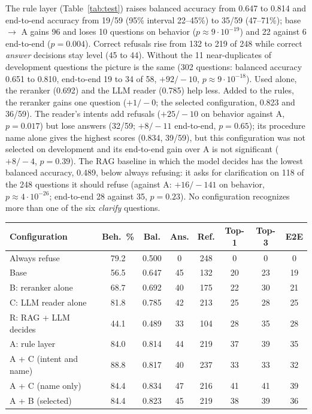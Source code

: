 The rule layer (Table~\ref{tab:test}) raises balanced accuracy from 0.647 to 0.814 and end-to-end accuracy from 19/59 (95\% interval
22--45\%) to 35/59 (47--71\%); base $\rightarrow$ A gains 96 and loses 10 questions on behavior ($p\approx 9\cdot10^{-19}$) and 22 against 6
end-to-end ($p=0.004$). Correct refusals rise from 132 to 219 of 248 while correct \emph{answer} decisions stay level (45 to 44). Without
the 11 near-duplicates of development questions the picture is the same (302 questions: balanced accuracy 0.651 to 0.810, end-to-end 19 to
34 of 58, $+92/-10$, $p\approx 9\cdot10^{-18}$). Used alone, the reranker (0.692) and the LLM reader (0.785) help less. Added to the rules,
the reranker gains one question ($+1/-0$; the selected configuration, 0.823 and 36/59). The reader's intents add refusals ($+25/-10$ on
behavior against A, $p=0.017$) but lose answers (32/59; $+8/-11$ end-to-end, $p=0.65$); its procedure name alone gives the highest scores
(0.834, 39/59), but this configuration was not selected on development and its end-to-end gain over A is not significant ($+8/-4$,
$p=0.39$). The RAG baseline in which the model decides has the lowest balanced accuracy, 0.489, below always refusing: it asks for
clarification on 118 of the 248 questions it should refuse (against A: $+16/-141$ on behavior, $p\approx 4\cdot10^{-26}$; end-to-end 28
against 35, $p=0.23$). No configuration recognizes more than one of the six \emph{clarify} questions.

\begin{table}[h]
{\begin{tabular}{@{}lccccccc@{}}\toprule
Configuration & Beh.\ \% & Bal. & Ans. & Ref. & Top-1 & Top-3 & E2E \\ \midrule
Always refuse & 79.2 & 0.500 & 0 & 248 & 0 & 0 & 0 \\
Base & 56.5 & 0.647 & 45 & 132 & 20 & 23 & 19 \\
B: reranker alone & 68.7 & 0.692 & 40 & 175 & 22 & 30 & 21 \\
C: LLM reader alone & 81.8 & 0.785 & 42 & 213 & 25 & 28 & 25 \\
R: RAG + LLM decides & 44.1 & 0.489 & 33 & 104 & 28 & 35 & 28 \\
A: rule layer & 84.0 & 0.814 & 44 & 219 & 37 & 39 & 35 \\
A + C (intent and name) & 88.8 & 0.817 & 40 & 237 & 33 & 33 & 32 \\
A + C (name only) & 84.4 & 0.834 & 47 & 216 & 41 & 41 & 39 \\
A + B (selected) & 84.4 & 0.823 & 45 & 219 & 38 & 39 & 36 \\ \bottomrule
\end{tabular}}
\end{table}

